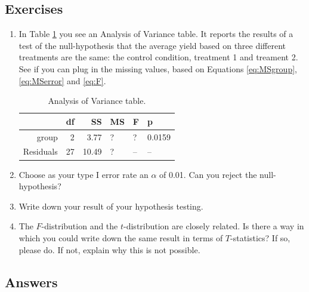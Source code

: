 \documentclass[]{book}\usepackage[]{graphicx}\usepackage[]{color}
\begin{document}
\subsection{Exercises}


\begin{enumerate}



\item In Table \ref{tab:anova_1} you see an Analysis of Variance table. It reports the results of a test of the null-hypothesis that the average yield based on three different treatments are the same: the control condition, treatment 1 and treament 2. See if you can plug in the missing values, based on Equations \ref{eq:MSgroup},\ref{eq:MSerror} and \ref{eq:F}.

\begin{table}[ht]
\centering
\caption{Analysis of Variance table.} 
\label{tab:anova_1}
\begin{tabular}{rrrlll}
  \hline
 & df & SS & MS & F & p \\ 
  \hline
group &   2 & 3.77 & ? & ? & 0.0159 \\ 
  Residuals &  27 & 10.49 & ? & -- & -- \\ 
   \hline
\end{tabular}
\end{table}


\item Choose as your type I error rate an $\alpha$ of 0.01. Can you reject the null-hypothesis? 

\item Write down your result of your hypothesis testing. 

\item The $F$-distribution and the $t$-distribution are closely related. Is there a way in which you could write down the same result in terms of $T$-statistics? If so, please do. If not, explain why this is not possible. 

\end{enumerate}

\subsection{Answers}
\end{document}
